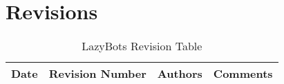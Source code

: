 \documentclass [11pt]{article}
\begin{document}
\section{Revisions}
\begin{longtable}{| p{ } | p{ } | p{ } | p{ } |}\caption{LazyBots Revision Table} \\\hline 

\centering \textbf{Date} & 
\multicolumn{1}{c|}{\textbf {Revision Number}} &
\multicolumn{1}{c|}{\textbf {Authors}} & 
\multicolumn{1}{c|}{\textbf {Comments}} \\ \hline



%
%

\end{longtable}
\end{document}
